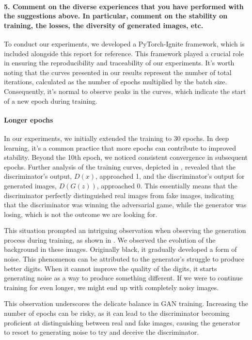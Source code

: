 \newpage
\paragraph*{5. Comment on the diverse experiences that you have performed with the suggestions above. In particular, comment on the stability on training, the losses, the diversity of generated images, etc.}

To conduct our experiments, we developed a PyTorch-Ignite framework, which is included alongside this report for reference. This framework played a crucial role in ensuring the reproducibility and traceability of our experiments. It's worth noting that the curves presented in our results represent the number of total iterations, calculated as the number of epochs multiplied by the batch size. Consequently, it's normal to observe peaks in the curves, which indicate the start of a new epoch during training.

\paragraph*{Longer epochs}
In our experiments, we initially extended the training to 30 epochs. In deep learning, it's a common practice that more epochs can contribute to improved stability. Beyond the 10th epoch, we noticed consistent convergence in subsequent epochs. Further analysis of the training curves, depicted in , revealed that the discriminator's output, $D(x)$, approached 1, and the discriminator's output for generated images, $D(G(z))$, approached 0. This essentially means that the discriminator perfectly distinguished real images from fake images, indicating that the discriminator was winning the adversarial game, while the generator was losing, which is not the outcome we are looking for. 

This situation prompted an intriguing observation when observing the generation process during training, as shown in . We observed the evolution of the background in these images. Originally black, it gradually developed a form of noise. This phenomenon can be attributed to the generator's struggle to produce better digits. When it cannot improve the quality of the digits, it starts generating noise as a way to produce something different. If we were to continue training for even longer, we might end up with completely noisy images. 

This observation underscores the delicate balance in GAN training. Increasing the number of epochs can be risky, as it can lead to the discriminator becoming proficient at distinguishing between real and fake images, causing the generator to resort to generating noise to try and deceive the discriminator.

